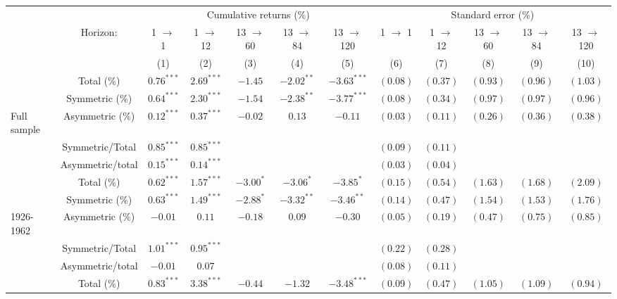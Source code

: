 \begin{tabular}{lccccccccccc}
   \toprule & & \multicolumn{5}{c}{Cumulative returns (\%)} & \multicolumn{5}{c}{Standard error (\%)} \\
 \cmidrule(l){2-7} \cmidrule(l){8-12} & Horizon: & 1 $\rightarrow$ 1 & 1 $\rightarrow$ 12 & 13 $\rightarrow$ 60 & 13 $\rightarrow$ 84 & 13 $\rightarrow$ 120 & 1 $\rightarrow$ 1 & 1 $\rightarrow$ 12 & 13 $\rightarrow$ 60 & 13 $\rightarrow$ 84 & 13 $\rightarrow$ 120 \\ 
   \cmidrule(l){3-7} \cmidrule(l){8-12} \vspace{5pt} &  & (1) & (2) & (3) & (4) & (5) & (6) & (7) & (8) & (9) & (10) \\ 
   & Total (\%) & $0.76^{***}$ & $2.69^{***}$ & $-1.45$ & $-2.02^{**}$ & $-3.63^{***}$ & $(0.08)$ & $(0.37)$ & $(0.93)$ & $(0.96)$ & $(1.03)$ \\ 
   & Symmetric (\%) & $0.64^{***}$ & $2.30^{***}$ & $-1.54$ & $-2.38^{**}$ & $-3.77^{***}$ & $(0.08)$ & $(0.34)$ & $(0.97)$ & $(0.97)$ & $(0.96)$ \\ 
   \vspace{5pt}Full sample & Asymmetric (\%) & $0.12^{***}$ & $0.37^{***}$ & $-0.02$ & $0.13$ & $-0.11$ & $(0.03)$ & $(0.11)$ & $(0.26)$ & $(0.36)$ & $(0.38)$ \\ 
   & Symmetric/Total & $0.85^{***}$ & $0.85^{***}$ &  &  &  & $(0.09)$ & $(0.11)$ &  &  &  \\ 
   \vspace{5pt} & Asymmetric/total & $0.15^{***}$ & $0.14^{***}$ &  &  &  & $(0.03)$ & $(0.04)$ &  &  &  \\ 
   \hline & Total (\%) & $0.62^{***}$ & $1.57^{***}$ & $-3.00^{*}$ & $-3.06^{*}$ & $-3.85^{*}$ & $(0.15)$ & $(0.54)$ & $(1.63)$ & $(1.68)$ & $(2.09)$ \\ 
   & Symmetric (\%) & $0.63^{***}$ & $1.49^{***}$ & $-2.88^{*}$ & $-3.32^{**}$ & $-3.46^{**}$ & $(0.14)$ & $(0.47)$ & $(1.54)$ & $(1.53)$ & $(1.76)$ \\ 
   \vspace{5pt}1926-1962 & Asymmetric (\%) & $-0.01$ & $0.11$ & $-0.18$ & $0.09$ & $-0.30$ & $(0.05)$ & $(0.19)$ & $(0.47)$ & $(0.75)$ & $(0.85)$ \\ 
   & Symmetric/Total & $1.01^{***}$ & $0.95^{***}$ &  &  &  & $(0.22)$ & $(0.28)$ &  &  &  \\ 
   \vspace{5pt} & Asymmetric/total & $-0.01$ & $0.07$ &  &  &  & $(0.08)$ & $(0.11)$ &  &  &  \\ 
   \hline & Total (\%) & $0.83^{***}$ & $3.38^{***}$ & $-0.44$ & $-1.32$ & $-3.48^{***}$ & $(0.09)$ & $(0.47)$ & $(1.05)$ & $(1.09)$ & $(0.94)$ \\ 

\end{tabular}
